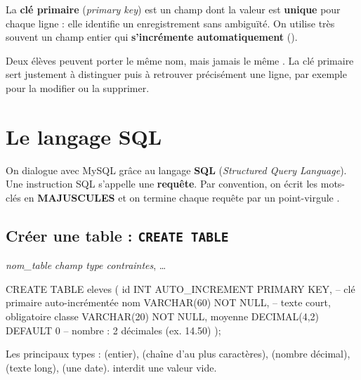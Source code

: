 \begin{definition}
La \textbf{clé primaire} (\emph{primary key}) est un champ dont la valeur est
\textbf{unique} pour chaque ligne : elle identifie un enregistrement sans
ambiguïté. On utilise très souvent un champ  entier qui
\textbf{s'incrémente automatiquement} ().
\end{definition}

\begin{remarque}
Deux élèves peuvent porter le même nom, mais jamais le même . La clé
primaire sert justement à distinguer puis à retrouver précisément une ligne, par
exemple pour la modifier ou la supprimer.
\end{remarque}

\section{Le langage SQL}

On dialogue avec MySQL grâce au langage \textbf{SQL} (\emph{Structured Query
Language}). Une instruction SQL s'appelle une \textbf{requête}. Par convention,
on écrit les mots-clés en \textbf{MAJUSCULES} et on termine chaque requête par un
point-virgule \code{;}.

\subsection{Créer une table : \texttt{CREATE TABLE}}

\begin{syntaxe}
 \textit{nom\_table} \code{(} \textit{champ type contraintes}, \dots \code{);}
\end{syntaxe}

\begin{codesql}
CREATE TABLE eleves (
  id       INT AUTO_INCREMENT PRIMARY KEY,  -- clé primaire auto-incrémentée
  nom      VARCHAR(60) NOT NULL,            -- texte court, obligatoire
  classe   VARCHAR(20) NOT NULL,
  moyenne  DECIMAL(4,2) DEFAULT 0           -- nombre : 2 décimales (ex. 14.50)
);
\end{codesql}

\begin{remarque}
Les principaux types :  (entier),  (chaîne d'au plus
 caractères),  (nombre décimal),  (texte
long),  (une date).  interdit une valeur vide.
\end{remarque}


